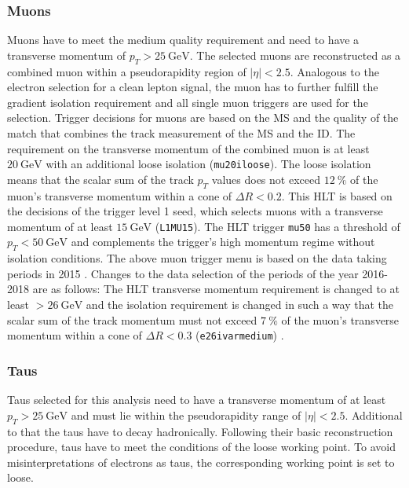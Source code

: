 \subsubsection*{Muons}
Muons have to meet the medium quality requirement and need to have a transverse momentum of $p_T>\SI{25}{\giga\electronvolt}$. The selected muons are reconstructed as a combined muon within a pseudorapidity region of $|\eta|<2.5$. Analogous to the electron selection for a clean lepton signal, the muon has to further fulfill the gradient isolation requirement and all single muon triggers are used for the selection.\newline
Trigger decisions for muons are based on the MS and the quality of the match that combines the track measurement of the MS and the ID. The requirement on the transverse momentum of the combined muon is at least $\SI{20}{\giga\electronvolt}$ with an additional loose isolation (\texttt{mu20\textunderscore iloose}). The loose isolation means that the scalar sum of the track $p_T$ values does not exceed $\SI{12}{\percent}$ of the muon's transverse momentum within a cone of $\Delta R<0.2$. This HLT is based on the decisions of the trigger level 1 seed, which selects muons with a transverse momentum of at least $\SI{15}{\giga\electronvolt}$ (\texttt{L1MU15}). The HLT trigger \texttt{mu50} has a threshold of $p_T<\SI{50}{\giga\electronvolt}$ and complements the trigger's high momentum regime without isolation conditions. The above muon trigger menu is based on the data taking periods in 2015 \cite{trigger:e:mu}. Changes to the data selection of the periods of the year 2016-2018 are as follows: \newline
The HLT transverse momentum requirement is changed to at least $>\SI{26}{\giga\electronvolt}$ and the isolation requirement is changed in such a way that the scalar sum of the track momentum must not exceed $\SI{7}{\percent}$ of the muon's transverse momentum within a cone of $\Delta R<0.3$ (\texttt{e26\textunderscore ivarmedium}) \cite{trigger:mu}.            
%
%
\subsubsection*{Taus}
Taus selected for this analysis need to have a transverse momentum of at least $p_T>\SI{25}{\giga\electronvolt}$ and must lie within the pseudorapidity range of $|\eta|<2.5$. Additional to that the taus have to decay hadronically. Following their basic reconstruction procedure, taus have to meet the conditions of the loose working point. To avoid misinterpretations of electrons as taus, the corresponding working point is set to loose.
